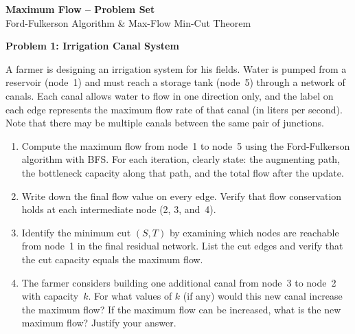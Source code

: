 \documentclass[11pt,a4paper]{article}
\begin{document}
\begin{center}
{\Large\bfseries Maximum Flow -- Problem Set}\\[4pt]
{\small Ford-Fulkerson Algorithm \& Max-Flow Min-Cut Theorem}
\end{center}

\bigskip

\textbf{\large Problem 1: Irrigation Canal System}
\medskip

A farmer is designing an irrigation system for his fields. Water is pumped from a reservoir (node~1) and must reach a storage tank (node~5) through a network of canals. Each canal allows water to flow in one direction only, and the label on each edge represents the maximum flow rate of that canal (in liters per second). Note that there may be multiple canals between the same pair of junctions.

\begin{center}
\end{center}

\begin{enumerate}[label=(\alph*)]
  \item Compute the maximum flow from node~1 to node~5 using the Ford-Fulkerson algorithm with BFS. For each iteration, clearly state: the augmenting path, the bottleneck capacity along that path, and the total flow after the update.

  \item Write down the final flow value on every edge. Verify that flow conservation holds at each intermediate node (2, 3, and~4).

  \item Identify the minimum cut $(S, T)$ by examining which nodes are reachable from node~1 in the final residual network. List the cut edges and verify that the cut capacity equals the maximum flow.

  \item The farmer considers building one additional canal from node~3 to node~2 with capacity~$k$. For what values of $k$ (if any) would this new canal increase the maximum flow? If the maximum flow can be increased, what is the new maximum flow? Justify your answer.
\end{enumerate}
\end{document}
